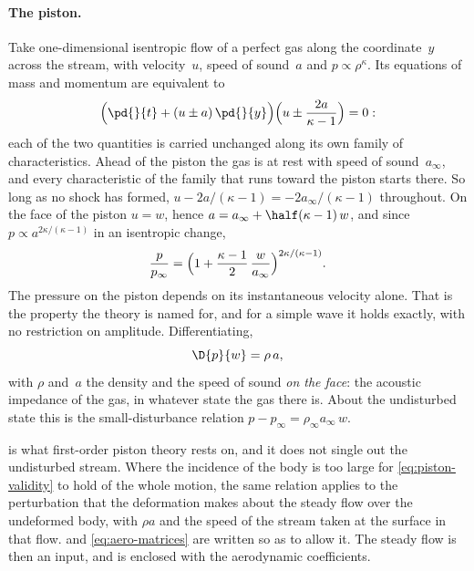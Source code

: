 \paragraph{The piston.}
Take one-dimensional isentropic flow of a perfect gas along the
coordinate~$y$ across the stream, with velocity~$u$, speed of sound~$a$ and
$p\propto\rho^\kappa$. Its equations of mass and momentum are equivalent to
\begin{equation}\label{eq:riemann}
  \Bigl(\pd{}{t} + (u\pm a)\,\pd{}{y}\Bigr)
  \Bigl(u \pm \frac{2a}{\kappa-1}\Bigr) = 0 :
\end{equation}
each of the two quantities is carried unchanged along its own family of
characteristics. Ahead of the piston the gas is at rest with speed of
sound~$a_\infty$, and every characteristic of the family that runs toward
the piston starts there. So long as no shock has formed,
$u - 2a/(\kappa-1) = -2a_\infty/(\kappa-1)$ throughout. On the face of the
piston $u = w$, hence $a = a_\infty + \half(\kappa-1)\,w$, and since
$p\propto a^{2\kappa/(\kappa-1)}$ in an isentropic change,
\begin{equation}\label{eq:piston-exact}
  \frac{p}{p_\infty}
  = \Bigl(1 + \frac{\kappa-1}{2}\,\frac{w}{a_\infty}\Bigr)^{2\kappa/(\kappa-1)} .
\end{equation}
The pressure on the piston depends on its instantaneous velocity alone. That
is the property the theory is named for, and for a simple wave it holds
exactly, with no restriction on amplitude. Differentiating,
\begin{equation}\label{eq:piston-linear}
  \D{p}{w} = \rho\,a ,
\end{equation}
with $\rho$ and~$a$ the density and the speed of sound \emph{on the face}:
the acoustic impedance of the gas, in whatever state the gas there is. About
the undisturbed state this is the small-disturbance relation
$p - p_\infty = \rho_\infty a_\infty\,w$.

\begin{remark}\label{rem:piston-local}
 is what first-order piston theory rests on, and it
does not single out the undisturbed stream. Where the incidence of the body
is too large for \cref{eq:piston-validity} to hold of the whole motion, the
same relation applies to the perturbation that the deformation makes about
the steady flow over the undeformed body, with $\rho a$ and the speed of the
stream taken at the surface in that flow.  and
\cref{eq:aero-matrices} are written so as to allow it. The steady flow is
then an input, and is enclosed with the aerodynamic coefficients.
\end{remark}

